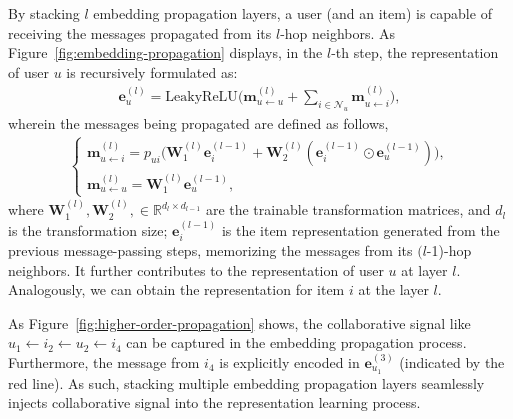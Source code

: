 \documentclass[sigconf]{acmart}
\newcommand{\Mat}[1]{\mathbf{#1}}
\newcommand{\Space}[1]{\mathbb{#1}}
\newcommand{\Set}[1]{\mathcal{#1}}
\theoremstyle{definition}
\begin{document}
By stacking $l$ embedding propagation layers, a user (and an item) is capable of receiving the messages propagated from its $l$-hop neighbors.
As Figure~\ref{fig:embedding-propagation} displays, in the $l$-th step, the representation of user $u$ is recursively formulated as:
\begin{gather}\label{equ:l-aggregator}
\Mat{e}_{u}^{(l)}=\text{LeakyReLU}\Big(\Mat{m}^{(l)}_{u\leftarrow u}+\sum_{i\in\Set{N}_{u}}\Mat{m}^{(l)}_{u\leftarrow i}\Big),
\end{gather}
wherein the messages being propagated are defined as follows,
\begin{gather}\label{equ:l-message}
\begin{cases}
\Mat{m}^{(l)}_{u\leftarrow i}=p_{ui}\Big(\Mat{W}^{(l)}_{1}\Mat{e}^{(l-1)}_{i} + \Mat{W}^{(l)}_{2}(\Mat{e}^{(l-1)}_{i}\odot\Mat{e}^{(l-1)}_{u})\Big),\\
\Mat{m}^{(l)}_{u\leftarrow u}=\Mat{W}^{(l)}_{1}\Mat{e}^{(l-1)}_{u},
\end{cases}
\end{gather}
where $\Mat{W}^{(l)}_{1},\Mat{W}^{(l)}_{2},\in\Space{R}^{d_{l}\times d_{l-1}}$ are the trainable transformation matrices, and $d_{l}$ is the transformation size;
$\Mat{e}_{i}^{(l-1)}$ is the item representation generated from the previous message-passing steps, memorizing the messages from its $(l$-1)-hop neighbors.
It further contributes to the representation of user $u$ at layer $l$.
Analogously, we can obtain the representation for item $i$ at the layer $l$.

As Figure~\ref{fig:higher-order-propagation} shows, the collaborative signal like $u_{1}\leftarrow i_{2}\leftarrow u_{2}\leftarrow i_{4}$ can be captured in the embedding propagation process.
Furthermore, the message from $i_{4}$ is explicitly encoded in $\Mat{e}^{(3)}_{u_{1}}$ (indicated by the red line).
As such, stacking multiple embedding propagation layers seamlessly injects collaborative signal into the representation learning process.
\end{document}
